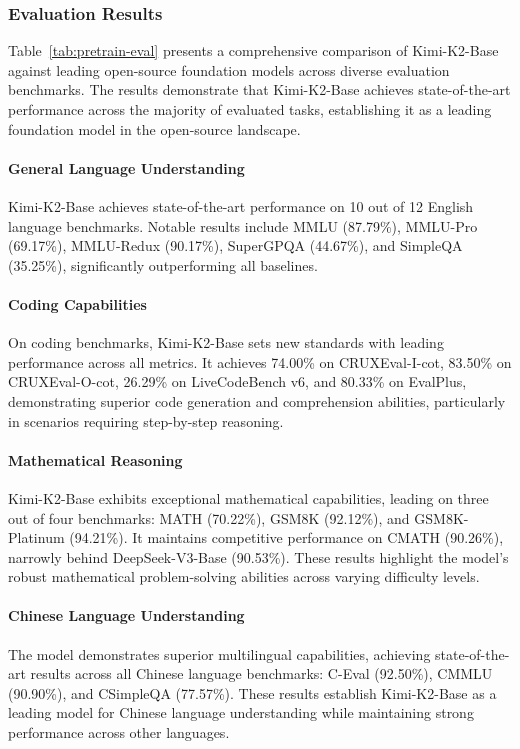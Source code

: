 \subsubsection{Evaluation Results}

Table~\ref{tab:pretrain-eval} presents a comprehensive comparison of Kimi-K2-Base against leading open-source foundation models across diverse evaluation benchmarks. The results demonstrate that Kimi-K2-Base achieves state-of-the-art performance across the majority of evaluated tasks, establishing it as a leading foundation model in the open-source landscape.

\paragraph{General Language Understanding}
Kimi-K2-Base achieves state-of-the-art performance on 10 out of 12 English language benchmarks. Notable results include MMLU (87.79\%), MMLU-Pro (69.17\%), MMLU-Redux (90.17\%), SuperGPQA (44.67\%), and SimpleQA (35.25\%), significantly outperforming all baselines.

\paragraph{Coding Capabilities}
On coding benchmarks, Kimi-K2-Base sets new standards with leading performance across all metrics. It achieves 74.00\% on CRUXEval-I-cot, 83.50\% on CRUXEval-O-cot, 26.29\% on LiveCodeBench v6, and 80.33\% on EvalPlus, demonstrating superior code generation and comprehension abilities, particularly in scenarios requiring step-by-step reasoning.

\paragraph{Mathematical Reasoning}
Kimi-K2-Base exhibits exceptional mathematical capabilities, leading on three out of four benchmarks: MATH (70.22\%), GSM8K (92.12\%), and GSM8K-Platinum (94.21\%). It maintains competitive performance on CMATH (90.26\%), narrowly behind DeepSeek-V3-Base (90.53\%). These results highlight the model's robust mathematical problem-solving abilities across varying difficulty levels.

\paragraph{Chinese Language Understanding}
The model demonstrates superior multilingual capabilities, achieving state-of-the-art results across all Chinese language benchmarks: C-Eval (92.50\%), CMMLU (90.90\%), and CSimpleQA (77.57\%). These results establish Kimi-K2-Base as a leading model for Chinese language understanding while maintaining strong performance across other languages.















